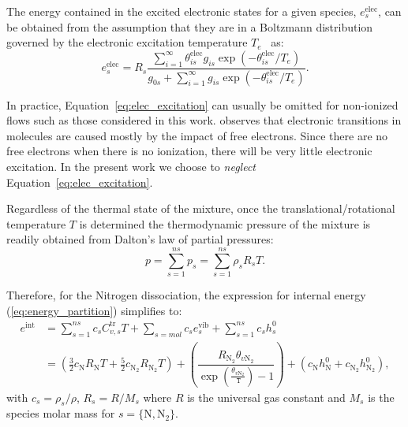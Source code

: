 \documentclass[10pt]{article}
\newcommand{\T}{\,\mathtt{T}}
\begin{document}
The energy contained in the excited electronic states for a given species, $e^{\text{elec}}_s$, can be obtained from the assumption that they are in a Boltzmann distribution governed by the electronic excitation temperature $T_e$~\citep{candler_thesis} as:
\begin{equation}
  \label{eq:elec_excitation}
  e^{\text{elec}}_s = R_s \frac{\sum_{i=1}^\infty \theta^{\text{elec}}_{is} g_{is} \exp\left(-\theta^{\text{elec}}_{is}/T_e\right)}{g_{0s} + \sum_{i=1}^\infty g_{is} \exp\left(-\theta^{\text{elec}}_{is}/T_e\right)}.
\end{equation}

In practice, Equation~\eqref{eq:elec_excitation} can usually be omitted for non-ionized flows such as those considered in this work. \citet{park_book} observes that electronic transitions in molecules are caused mostly by the impact of free electrons.  Since there are no free electrons when there is no ionization, there will be very little electronic excitation.  In the present work we choose to \textit{neglect} Equation~\eqref{eq:elec_excitation}.



Regardless of the thermal state of the mixture, once the translational/rotational temperature $T$ is determined the thermodynamic pressure of the mixture is readily obtained from Dalton's law of partial pressures:
\begin{equation}
 p = \sum_{s=1}^{ns} p_s = \sum_{s=1}^{ns} \rho_s R_s T .
 \label{eq:p_eq_state}
\end{equation}


Therefore, for the Nitrogen dissociation, the expression for internal energy (\ref{eq:energy_partition}) simplifies to:
\begin{equation}
 \label{eq:rE-T-Tv-relationship}
\begin{split}
 e^{\text{int}} &= \sum_{s=1}^{ns} c_s C^{\text{tr}}_{v,s} T + \sum_{s=mol} c_s e^{\text{vib}}_s + \sum_{s=1}^{ns} c_s h^0_s\\
&=\left(\frac{3}{2} c_{\text{N}} R_{\text{N}} T + \frac{5}{2} c_{\text{N}_2} R_{\text{N}_2} T\right)+ \left(\dfrac{R_{\text{N}_2} \theta_{v \text{N}_2}}{\exp\left(\frac{\theta_{v \text{N}_2}}{\T}\right)-1} \right)+ \left(   c_{\text{N}} h_{\text{N}}^0 + c_{\text{N}_2} h_{\text{N}_2}^0 \right),
\end{split}
\end{equation}
with $c_s=\rho_s/\rho$, $R_s = R/M_s$ where $R$ is the universal gas constant and $M_s$ is the species molar mass for $s=\{\text{N},\text{N}_2\}$.
\end{document}
